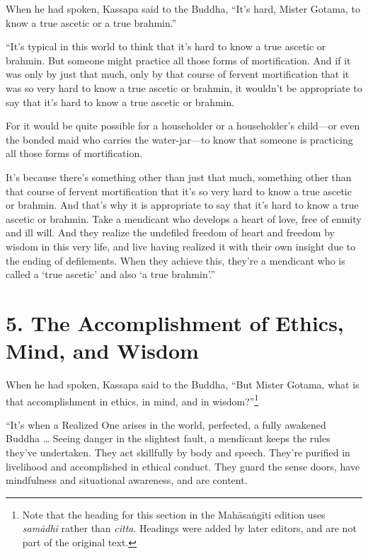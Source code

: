 \documentclass[12pt,openany]{book}%
\begin{document}
When he had spoken, Kassapa said to the Buddha, “It’s hard, Mister Gotama, to know a true ascetic or a true brahmin.” 

“It’s typical in this world to think that it’s hard to know a true ascetic or brahmin. But someone might practice all those forms of mortification. And if it was only by just that much, only by that  course of fervent mortification that it was so very hard to know a true ascetic or brahmin, it wouldn’t be appropriate to say that it’s hard to know a true ascetic or brahmin. 

For it would be quite possible for a householder or a householder’s child—or even the bonded maid who carries the water-jar—to know that someone is practicing all those forms of mortification. 

It’s because there’s something other than just that much, something other than that course of fervent mortification that it’s so very hard to know a true ascetic or brahmin. And that’s why it is appropriate to say that it’s hard to know a true ascetic or brahmin. Take a mendicant who develops a heart of love, free of enmity and ill will. And they realize the undefiled freedom of heart and freedom by wisdom in this very life, and live having realized it with their own insight due to the ending of defilements. When they achieve this, they’re a mendicant who is called a ‘true ascetic’ and also ‘a true brahmin’.” 

\section*{5. The Accomplishment of Ethics, Mind, and Wisdom }

When he had spoken, Kassapa said to the Buddha, “But Mister Gotama, what is that accomplishment in ethics, in mind, and in wisdom?”\footnote{Note that the heading for this section in the \textsanskrit{Mahāsaṅgīti} edition uses \textit{\textsanskrit{samādhi}} rather than \textit{citta}. Headings were added by later editors, and are not part of the original text. } 

“It’s when a Realized One arises in the world, perfected, a fully awakened Buddha … Seeing danger in the slightest fault, a mendicant keeps the rules they’ve undertaken. They act skillfully by body and speech. They’re purified in livelihood and accomplished in ethical conduct. They guard the sense doors, have mindfulness and situational awareness, and are content. 
\end{document}
